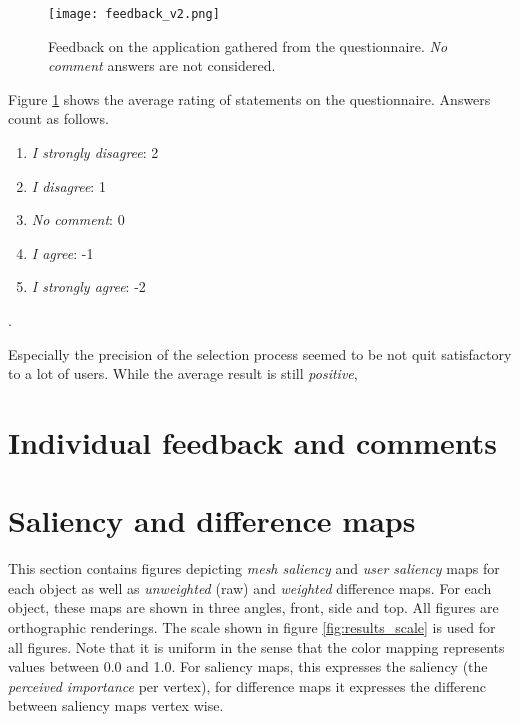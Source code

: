 \begin{figure}[htb]
	\centering
	\texttt{[image: feedback\_v2.png]}\\ %
	\caption{Feedback on the application gathered from the questionnaire. \textit{No comment} answers are not considered.}
	\label{fig:feedback_questionnaire}
\end{figure}

Figure \ref{fig:feedback_questionnaire} shows the average rating of statements on the questionnaire. Answers count as follows.

\begin{enumerate}
	\item \textit{I strongly disagree}: 2
	\item \textit{I disagree}: 1
	\item \textit{No comment}: 0
	\item \textit{I agree}: -1
	\item \textit{I strongly agree}: -2
\end{enumerate}.

Especially the precision of the selection process seemed to be not quit satisfactory to a lot of users. While the average result is still \textit{positive}, 

	\section{Individual feedback and comments}
	\label{sec:individual_feedback_and_comments}

	\section{Saliency and difference maps}
	\label{sec:saliency_and_difference_maps}
This section contains figures depicting \textit{mesh saliency} and \textit{user saliency} maps for each object as well as \textit{unweighted} (raw) and \textit{weighted} difference maps. For each object, these maps are shown in three angles, front, side and top. All figures are orthographic renderings. The scale shown in figure \ref{fig:results_scale} is used for all figures. Note that it is uniform in the sense that the color mapping represents values between 0.0 and 1.0. For saliency maps, this expresses the saliency (the \textit{perceived importance} per vertex), for difference maps it expresses the differenc between saliency maps vertex wise.

